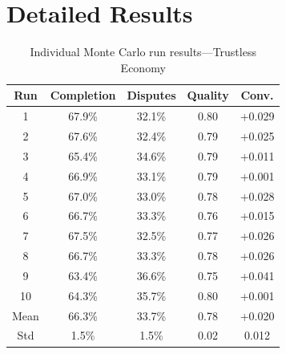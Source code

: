 \documentclass[11pt,a4paper]{article}
\begin{document}
\section{Detailed Results}
\label{app:results}

\begin{table}[H]
\centering
\caption{Individual Monte Carlo run results---Trustless Economy}
\begin{tabular}{ccccc}
\toprule
Run & Completion & Disputes & Quality & Conv. \\
\midrule
1 & 67.9\% & 32.1\% & 0.80 & +0.029 \\
2 & 67.6\% & 32.4\% & 0.79 & +0.025 \\
3 & 65.4\% & 34.6\% & 0.79 & +0.011 \\
4 & 66.9\% & 33.1\% & 0.79 & +0.001 \\
5 & 67.0\% & 33.0\% & 0.78 & +0.028 \\
6 & 66.7\% & 33.3\% & 0.76 & +0.015 \\
7 & 67.5\% & 32.5\% & 0.77 & +0.026 \\
8 & 66.7\% & 33.3\% & 0.78 & +0.026 \\
9 & 63.4\% & 36.6\% & 0.75 & +0.041 \\
10 & 64.3\% & 35.7\% & 0.80 & +0.001 \\
\midrule
Mean & 66.3\% & 33.7\% & 0.78 & +0.020 \\
Std & 1.5\% & 1.5\% & 0.02 & 0.012 \\
\bottomrule
\end{tabular}
\end{table}
\end{document}
